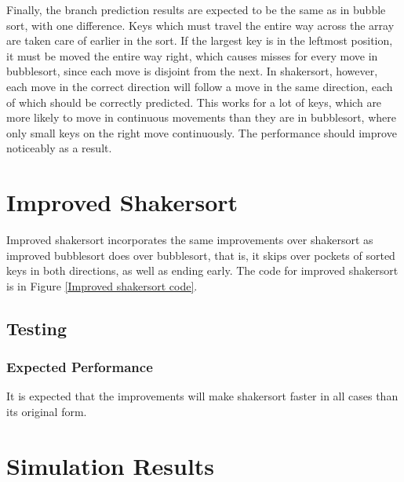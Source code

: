 Finally, the branch prediction results are expected to be the same as in bubble
sort, with one difference.  Keys which must travel the entire way across the
array are taken care of earlier in the sort. If the largest key is in the
leftmost position, it must be moved the entire way right, which causes misses
for every move in bubblesort, since each move is disjoint from the next. In
shakersort, however, each move in the correct direction will follow a move in the
same direction, each of which should be correctly predicted. This works for a
lot of keys, which are more likely to move in continuous movements than they are
in bubblesort, where only small keys on the right move continuously. The
performance should improve noticeably as a result.

\section{Improved Shakersort}
Improved shakersort incorporates the same improvements over shakersort as
improved bubblesort does over bubblesort, that is, it skips over pockets of
sorted keys in both directions, as well as ending early. The code for improved
shakersort is in Figure \vref{Improved shakersort code}.

\subsection{Testing}
\subsubsection{Expected Performance}
It is expected that the improvements will make shakersort faster in all cases
than its original form.

\section{Simulation Results}


